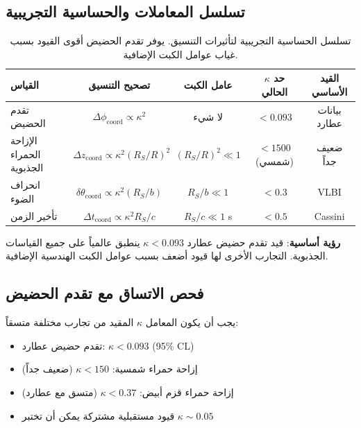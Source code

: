 \documentclass[11pt,a4paper]{article}
\begin{document}
	\subsection{تسلسل المعاملات والحساسية التجريبية}
	
	\begin{table}[htbp]
		\centering
		\scriptsize
		\begin{english}
			\begin{tabular}{lcccc}
				\toprule
				\textbf{القياس} & \textbf{تصحيح التنسيق} & \textbf{عامل الكبت} & \textbf{حد $\kappa$ الحالي} & \textbf{القيد الأساسي} \\
				\midrule
				تقدم الحضيض & $\Delta\phi_{\text{coord}} \propto \kappa^2$ & لا شيء & $<0.093$ & بيانات عطارد \\
				الإزاحة الحمراء الجذبوية & $\Delta z_{\text{coord}} \propto \kappa^2(R_S/R)^2$ & $(R_S/R)^2 \ll 1$ & $<1500$ (شمسي) & ضعيف جداً \\
				انحراف الضوء & $\delta\theta_{\text{coord}} \propto \kappa^2(R_S/b)$ & $R_S/b \ll 1$ & $<0.3$ & VLBI \\
				تأخير الزمن & $\Delta t_{\text{coord}} \propto \kappa^2 R_S/c$ & $R_S/c \ll 1$ s & $<0.5$ & Cassini \\
				\bottomrule
			\end{tabular}
		\end{english}
		\caption{تسلسل الحساسية التجريبية لتأثيرات التنسيق. يوفر تقدم الحضيض أقوى القيود بسبب غياب عوامل الكبت الإضافية.}
		\label{tab:sensitivity-hierarchy}
	\end{table}
	
	\textbf{رؤية أساسية}: قيد تقدم حضيض عطارد $\kappa < 0.093$ ينطبق عالمياً على جميع القياسات الجذبوية. التجارب الأخرى لها قيود أضعف بسبب عوامل الكبت الهندسية الإضافية.
	
	\subsection{فحص الاتساق مع تقدم الحضيض}
	
	يجب أن يكون المعامل $\kappa$ المقيد من تجارب مختلفة متسقاً:
	\begin{itemize}
		\item تقدم حضيض عطارد: $\kappa < 0.093$ (95\% CL)
		\item إزاحة حمراء شمسية: $\kappa < 150$ (ضعيف جداً)
		\item إزاحة حمراء قزم أبيض: $\kappa < 0.37$ (متسق مع عطارد)
		\item قيود مستقبلية مشتركة يمكن أن تختبر $\kappa \sim 0.05$
	\end{itemize}
	
\end{document}
